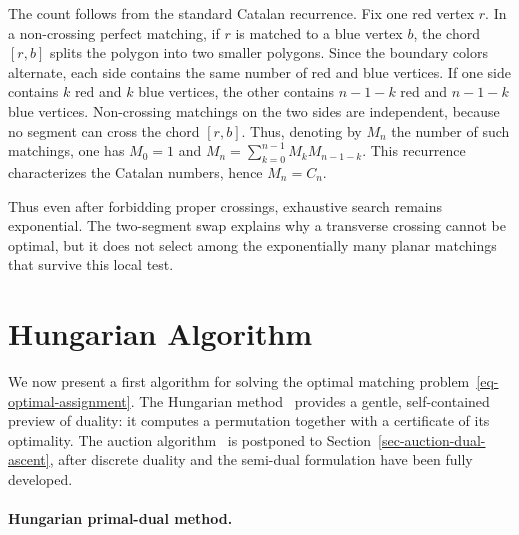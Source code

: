 \begin{rem}
		The count follows from the standard Catalan recurrence. Fix one red vertex $r$. In a non-crossing perfect matching, if $r$ is matched to a blue vertex $b$, the chord $[r,b]$ splits the polygon into two smaller polygons. Since the boundary colors alternate, each side contains the same number of red and blue vertices. If one side contains $k$ red and $k$ blue vertices, the other contains $n-1-k$ red and $n-1-k$ blue vertices. Non-crossing matchings on the two sides are independent, because no segment can cross the chord $[r,b]$. Thus, denoting by $M_n$ the number of such matchings,
		one has $M_0=1$ and $M_n=\sum_{k=0}^{n-1}M_kM_{n-1-k}$.
	This recurrence characterizes the Catalan numbers, hence $M_n=C_n$.
\end{rem}

Thus even after forbidding proper crossings, exhaustive search remains exponential. The two-segment swap explains why a transverse crossing cannot be optimal, but it does not select among the exponentially many planar matchings that survive this local test.


\section{Hungarian Algorithm}

We now present a first algorithm for solving the optimal matching problem~\eqref{eq-optimal-assignment}. The Hungarian method~\cite{Kuhn1955,Burkard09} provides a gentle, self-contained preview of duality: it computes a permutation together with a certificate of its optimality. The auction algorithm~\cite{bertsekas1981new,bertsekas1992auction} is postponed to Section~\ref{sec-auction-dual-ascent}, after discrete duality and the semi-dual formulation have been fully developed.

\paragraph{Hungarian primal-dual method.}

